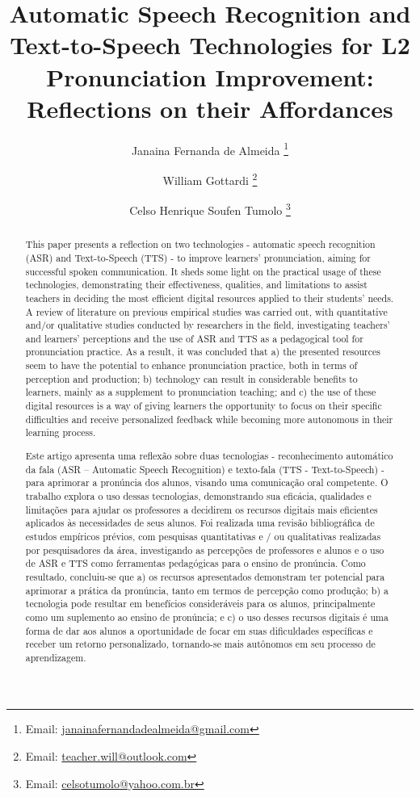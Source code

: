 \documentclass[english]{textolivre}
\title{Automatic Speech Recognition and Text-to-Speech Technologies for L2 Pronunciation Improvement: Reflections on their Affordances}
\author[1]{Janaina Fernanda de Almeida \orcid{0000-0003-3747-0279} \thanks{Email: \url{janainafernandadealmeida@gmail.com}}}
\author[1]{William Gottardi \orcid{0000-0002-1291-3953} \thanks{Email: \url{teacher.will@outlook.com}}}
\author[1]{Celso Henrique Soufen Tumolo \orcid{0000-0001-5045-8712} \thanks{Email: \url{celsotumolo@yahoo.com.br}}}
\affil[1]{Universidade Federal de Santa Catarina, Departamento de Língua e Literatura Estrangeiras, Florianópolis, Santa Catarina, Brasil.}
\begin{document}
\maketitle

\begin{polyabstract}
\begin{abstract}
This paper presents a reflection on two technologies - automatic speech recognition (ASR) and Text-to-Speech (TTS) - to improve learners’ pronunciation, aiming for successful spoken communication. It sheds some light on the practical usage of these technologies, demonstrating their effectiveness, qualities, and limitations to assist teachers in deciding the most efficient digital resources applied to their students’ needs. A review of literature on previous empirical studies was carried out, with quantitative and/or qualitative studies conducted by researchers in the field, investigating teachers’ and learners' perceptions and the use of ASR and TTS as a pedagogical tool for pronunciation practice. As a result, it was concluded that a) the presented resources seem to have the potential to enhance pronunciation practice, both in terms of perception and production; b) technology can result in considerable benefits to learners, mainly as a supplement to pronunciation teaching; and c) the use of these digital resources is a way of giving learners the opportunity to focus on their specific difficulties and receive personalized feedback while becoming more autonomous in their learning process.

\end{abstract}

\begin{portuguese}
\begin{abstract}
Este artigo apresenta uma reflexão sobre duas tecnologias - reconhecimento automático da fala (ASR – Automatic Speech Recognition) e texto-fala (TTS - Text-to-Speech) - para aprimorar a pronúncia dos alunos, visando uma comunicação oral competente. O trabalho explora o uso dessas tecnologias, demonstrando sua eficácia, qualidades e limitações para ajudar os professores a decidirem os recursos digitais mais eficientes aplicados às necessidades de seus alunos. Foi realizada uma revisão bibliográfica de estudos empíricos prévios, com pesquisas quantitativas e / ou qualitativas realizadas por pesquisadores da área, investigando as percepções de professores e alunos e o uso de ASR e TTS como ferramentas pedagógicas para o ensino de pronúncia. Como resultado, concluiu-se que a) os recursos apresentados demonstram ter potencial para aprimorar a prática da pronúncia, tanto em termos de percepção como produção; b) a tecnologia pode resultar em benefícios consideráveis para os alunos, principalmente como um suplemento ao ensino de pronúncia; e c) o uso desses recursos digitais é uma forma de dar aos alunos a oportunidade de focar em suas dificuldades específicas e receber um retorno personalizado, tornando-se mais autônomos em seu processo de aprendizagem.


\end{abstract}
\end{portuguese}
\end{polyabstract}
\end{document}
